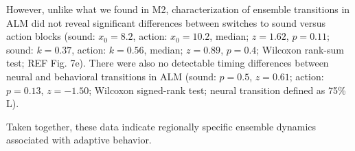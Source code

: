 However, unlike what we found in M2, characterization of ensemble transitions in ALM did not reveal significant differences between switches to sound versus action blocks (sound: $x_0 = 8.2$, action: $x_0 = 10.2$, median; $z = 1.62$, $p = 0.11$; sound: $k = 0.37$, action: $k = 0.56$, median; $z = 0.89$, $p = 0.4$; Wilcoxon rank-sum test; REF Fig. 7e). There were also no detectable timing differences between neural and behavioral transitions in ALM (sound: $p = 0.5$, $z = 0.61$; action: $p = 0.13$, $z = -1.50$; Wilcoxon signed-rank test; neural transition defined as 75\% L). 

Taken together, these data indicate regionally specific ensemble dynamics associated with adaptive behavior.